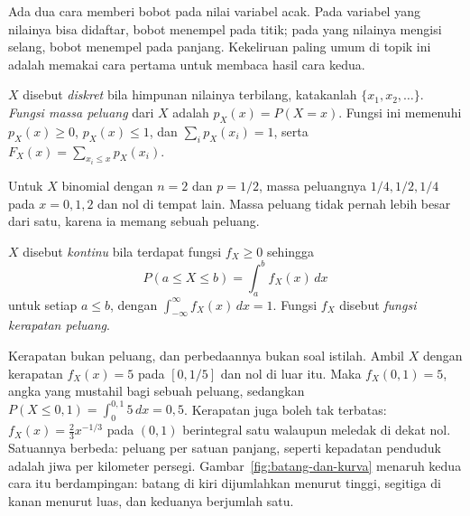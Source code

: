 Ada dua cara memberi bobot pada nilai variabel acak. Pada variabel yang nilainya bisa
didaftar, bobot menempel pada titik; pada yang nilainya mengisi selang, bobot menempel
pada panjang. Kekeliruan paling umum di topik ini adalah memakai cara pertama untuk
membaca hasil cara kedua.

\begin{definisi}
$X$ disebut \emph{diskret} bila himpunan nilainya terbilang, katakanlah
$\{x_1,x_2,\dots\}$. \emph{Fungsi massa peluang} dari $X$ adalah $p_X(x)=P(X=x)$.
Fungsi ini memenuhi $p_X(x)\ge0$, $p_X(x)\le1$, dan $\sum_i p_X(x_i)=1$, serta
$F_X(x)=\sum_{x_i\le x}p_X(x_i)$.
\end{definisi}

Untuk $X$ binomial dengan $n=2$ dan $p=1/2$, massa peluangnya $1/4,1/2,1/4$ pada
$x=0,1,2$ dan nol di tempat lain. Massa peluang tidak pernah lebih besar dari satu,
karena ia memang sebuah peluang.

\begin{definisi}
$X$ disebut \emph{kontinu} bila terdapat fungsi $f_X\ge0$ sehingga
\[
P(a\le X\le b)=\int_a^b f_X(x)\,dx
\]
untuk setiap $a\le b$, dengan $\int_{-\infty}^{\infty}f_X(x)\,dx=1$. Fungsi $f_X$
disebut \emph{fungsi kerapatan peluang}.
\end{definisi}

Kerapatan bukan peluang, dan perbedaannya bukan soal istilah. Ambil $X$ dengan
kerapatan $f_X(x)=5$ pada $[0,1/5]$ dan nol di luar itu. Maka $f_X(0{,}1)=5$, angka
yang mustahil bagi sebuah peluang, sedangkan
$P(X\le0{,}1)=\int_0^{0{,}1}5\,dx=0{,}5$. Kerapatan juga boleh tak terbatas:
$f_X(x)=\tfrac23x^{-1/3}$ pada $(0,1)$ berintegral satu walaupun meledak di dekat nol.
Satuannya berbeda: peluang per satuan panjang, seperti kepadatan penduduk adalah jiwa
per kilometer persegi. Gambar~\ref{fig:batang-dan-kurva} menaruh
kedua cara itu berdampingan: batang di kiri dijumlahkan menurut tinggi, segitiga di
kanan menurut luas, dan keduanya berjumlah satu.

